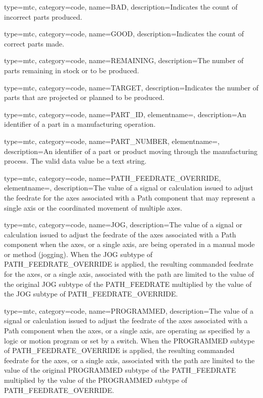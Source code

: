 {
  type=mtc,
  category=code,
  name={BAD},
  description={Indicates the count of incorrect parts produced.}
}

{
  type=mtc,
  category=code,
  name={GOOD},
  description={Indicates the count of correct parts made.}
}

{
  type=mtc,
  category=code,
  name={REMAINING},
  description={The number of parts remaining in stock or to be produced.}
}

{
  type=mtc,
  category=code,
  name={TARGET},
  description={Indicates the number of parts that are projected or planned to be produced.}
}

{
  type=mtc,
  category=code,
  name={PART\_ID},
  elementname=,
  description={An identifier of a part in a manufacturing operation.}
}

{
  type=mtc,
  category=code,
  name={PART\_NUMBER},
  elementname=,
  description={An identifier of a part or product moving through the manufacturing process.  The \gls{valid data value} \must be a text string. }
}

{
  type=mtc,
  category=code,
  name={PATH\_FEEDRATE\_OVERRIDE},
  elementname=,
  description={The value of a signal or calculation issued to adjust the feedrate for the axes associated with a Path component that may represent a single axis or the coordinated movement of multiple axes.}
}

{
  type=mtc,
  category=code,
  name={JOG},
  description={The value of a signal or calculation issued to adjust the feedrate of the axes associated with a Path component when the axes, or a single axis, are being operated in a manual mode or method (jogging).   \newline When the JOG subtype of PATH\_FEEDRATE\_OVERRIDE is applied, the resulting commanded feedrate for the axes, or a single axis, associated with the path are limited to the value of the original JOG subtype of the PATH\_FEEDRATE multiplied by the value of the JOG subtype of PATH\_FEEDRATE\_OVERRIDE.}
}

{
  type=mtc,
  category=code,
  name={PROGRAMMED},
  description={The value of a signal or calculation issued to adjust the feedrate of the axes associated with a Path component when the axes, or a single axis, are operating as specified by a logic or motion program or set by a switch. \newline When the PROGRAMMED subtype of PATH\_FEEDRATE\_OVERRIDE is applied, the resulting commanded feedrate for the axes, or a single axis, associated with the path are limited to the value of the original PROGRAMMED subtype of the PATH\_FEEDRATE multiplied by the value of the PROGRAMMED subtype of PATH\_FEEDRATE\_OVERRIDE.}
}

